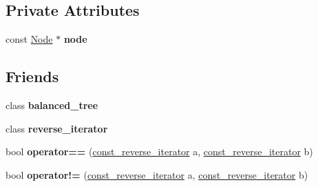\subsection*{Private Attributes}
\begin{DoxyCompactItemize}
\item 
\hypertarget{classbalanced__tree_1_1const__reverse__iterator_ae320e3ddc88f183a77557b702eda307b}{const \hyperlink{structbalanced__tree_1_1Node}{Node} $\ast$ {\bfseries node}}\label{classbalanced__tree_1_1const__reverse__iterator_ae320e3ddc88f183a77557b702eda307b}

\end{DoxyCompactItemize}
\subsection*{Friends}
\begin{DoxyCompactItemize}
\item 
\hypertarget{classbalanced__tree_1_1const__reverse__iterator_a080cd3957bad1460e07534ae55222a40}{class {\bfseries balanced\+\_\+tree}}\label{classbalanced__tree_1_1const__reverse__iterator_a080cd3957bad1460e07534ae55222a40}

\item 
\hypertarget{classbalanced__tree_1_1const__reverse__iterator_af0a70641f2216cc31420487a62dd3b0d}{class {\bfseries reverse\+\_\+iterator}}\label{classbalanced__tree_1_1const__reverse__iterator_af0a70641f2216cc31420487a62dd3b0d}

\item 
\hypertarget{classbalanced__tree_1_1const__reverse__iterator_adbc16e30e3de6ad85834cbe207d07d9f}{bool {\bfseries operator==} (\hyperlink{classbalanced__tree_1_1const__reverse__iterator}{const\+\_\+reverse\+\_\+iterator} a, \hyperlink{classbalanced__tree_1_1const__reverse__iterator}{const\+\_\+reverse\+\_\+iterator} b)}\label{classbalanced__tree_1_1const__reverse__iterator_adbc16e30e3de6ad85834cbe207d07d9f}

\item 
\hypertarget{classbalanced__tree_1_1const__reverse__iterator_a98680af58617c5f0fa85aa7b410c1d10}{bool {\bfseries operator!=} (\hyperlink{classbalanced__tree_1_1const__reverse__iterator}{const\+\_\+reverse\+\_\+iterator} a, \hyperlink{classbalanced__tree_1_1const__reverse__iterator}{const\+\_\+reverse\+\_\+iterator} b)}\label{classbalanced__tree_1_1const__reverse__iterator_a98680af58617c5f0fa85aa7b410c1d10}

\end{DoxyCompactItemize}


